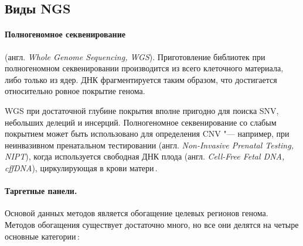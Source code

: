 \documentclass[a4paper,14pt]{extarticle}
\newcommand{\engterm}[1]{англ. \textenglish{\textit{#1}}}
\begin{document}
\subsection{Виды NGS}

\paragraph{Полногеномное секвенирование} (\engterm{Whole Genome Sequencing, WGS}).
Приготовление библиотек при полногеномном секвенировании производится из всего клеточного материала, либо только из ядер.
ДНК фрагментируется таким образом, что достигается относительно ровное покрытие генома.

WGS при достаточной глубине покрытия вполне пригодно для поиска SNV, небольших делеций и инсерций.
Полногеномное секвенирование со слабым покрытием может быть использовано для определения CNV "--- например, при неинвазивном пренатальном тестировании (\engterm{Non-Invasive Prenatal Testing, NIPT}), когда используется свободная ДНК плода (\engterm{Cell-Free Fetal DNA, cffDNA}), циркулирующая в крови матери\,\citep{Yu_2019}.

\paragraph{Таргетные панели.}
Основой данных методов является обогащение целевых регионов генома.
Методов обогащения существует достаточно много, но все они делятся на четыре основные категории\,\citep{Teer_2010}:
\end{document}
